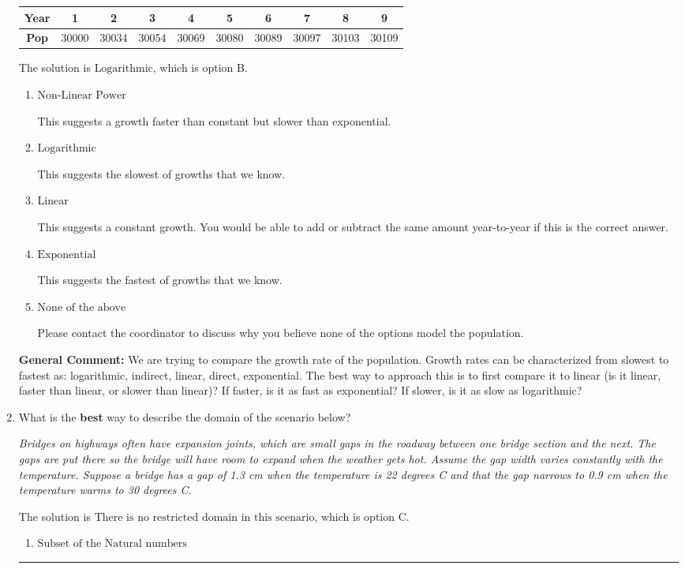 \documentclass{extbook}[14pt]
\newcommand{\litem}[1]{\item #1

\rule{\textwidth}{0.4pt}}
\begin{document}
\begin{enumerate}
{\begin{tabular}{c|c|c|c|c|c|c|c|c|c}
\textbf{Year} &1 &2 &3 &4 &5 &6 &7 &8 &9\tabularnewline \hline
\textbf{Pop} &30000 &30034 &30054 &30069 &30080 &30089 &30097 &30103 &30109\end{tabular}The solution is \( \text{Logarithmic} \), which is option B.\begin{enumerate}[label=\Alph*.]
\item \( \text{Non-Linear Power} \)

This suggests a growth faster than constant but slower than exponential.
\item \( \text{Logarithmic} \)

This suggests the slowest of growths that we know.
\item \( \text{Linear} \)

This suggests a constant growth. You would be able to add or subtract the same amount year-to-year if this is the correct answer.
\item \( \text{Exponential} \)

This suggests the fastest of growths that we know.
\item \( \text{None of the above} \)

Please contact the coordinator to discuss why you believe none of the options model the population.
\end{enumerate}

\textbf{General Comment:} We are trying to compare the growth rate of the population. Growth rates can be characterized from slowest to fastest as: logarithmic, indirect, linear, direct, exponential. The best way to approach this is to first compare it to linear (is it linear, faster than linear, or slower than linear)? If faster, is it as fast as exponential? If slower, is it as slow as logarithmic?
}
\litem{
What is the \textbf{best} way to describe the domain of the scenario below?

\begin{center}
    \textit{ Bridges on highways often have expansion joints, which are small gaps in the roadway between one bridge section and the next. The gaps are put there so the bridge will have room to expand when the weather gets hot. Assume the gap width varies constantly with the temperature. Suppose a bridge has a gap of 1.3 cm when the temperature is 22 degrees C and that the gap narrows to 0.9 cm when the temperature warms to 30 degrees C. }
\end{center}
The solution is \( \text{There is no restricted domain in this scenario} \), which is option C.\begin{enumerate}[label=\Alph*.]
\item \( \text{Subset of the Natural numbers} \)


\end{enumerate}}
\end{enumerate}
\end{document}

